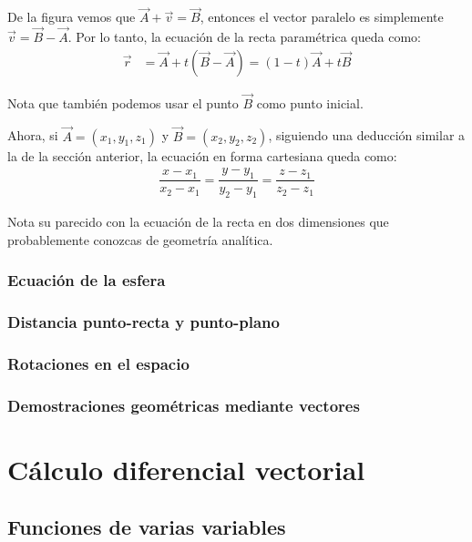 \documentclass[12pt, fleqn]{report}                             %
\newcommand{\Wrap}[1]{\left( #1 \right)}                        %
\begin{document}
        	De la figura vemos que $\vec{A}+\vec{v}=\vec{B}$, entonces el vector paralelo es simplemente $\vec{v}=\vec{B}-\vec{A}$. Por lo tanto, la ecuación de la recta paramétrica queda como:
        	\begin{align}
	        	\vec{r} &= \vec{A} + t\Wrap{\vec{B}-\vec{A}} = (1-t)\vec{A}+t\vec{B} \label{lineEquation2}
        	\end{align}
        	
        	Nota que también podemos usar el punto $\vec{B}$ como punto inicial.
        	
        	Ahora, si $\vec{A}=(x_1, y_1, z_1)$ y $\vec{B}=(x_2, y_2, z_2)$, siguiendo una deducción similar a la de la sección anterior, la ecuación en forma cartesiana queda como:
        	\begin{align}
	        	\dfrac{x - x_1}{x_2 - x_1} = \dfrac{y - y_1}{y_2 - y_1} = \dfrac{z - z_1}{z_2 - z_1} \label{lineEquation3}
        	\end{align}
        	
        	Nota su parecido con la ecuación de la recta en dos dimensiones que probablemente conozcas de geometría analítica.
        
        \section{Ecuación de la esfera}
            
        \section{Distancia punto-recta y punto-plano}
        
        \section{Rotaciones en el espacio}
        
        \section{Demostraciones geométricas mediante vectores}
            


\part{Cálculo diferencial vectorial}

    \chapter{Funciones de varias variables}
    
\end{document}
